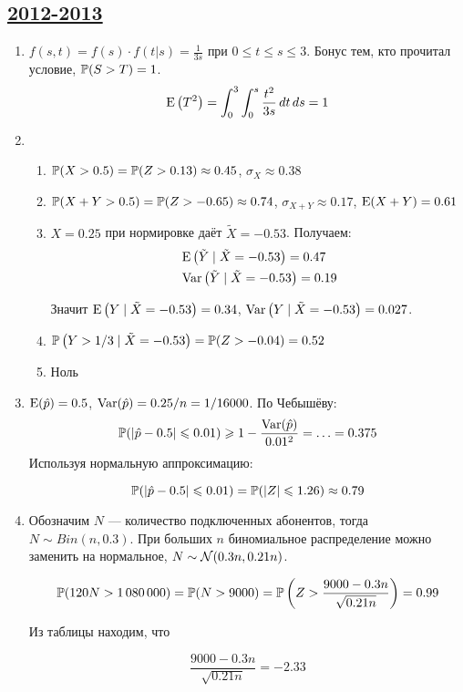 \subsection[2012-2013]{\hyperref[sec:kr_02_2012_2013]{2012-2013}}
\label{sec:sol_kr_02_2012_2013}

\begin{enumerate}
\item  $f(s,t)=f(s)\cdot f(t|s)=\frac{1}{3s}$ при $0\leq t\leq s\leq 3$.
Бонус тем, кто прочитал условие, $\P(S>T)=1$.
\[
\E\left(T^2\right) = \int_0^3\int_0^s \frac{t^2}{3s}\,dt\,ds = 1
\]
\item
\begin{enumerate}
\item $\P(X>0.5) = \P(Z > 0.13) \approx 0.45$, $\sigma_X \approx 0.38$
\item $\P(X+Y>0.5) =
\P(Z>-0.65)\approx 0.74$,
$\sigma_{X+Y} \approx 0.17$, $\E(X+Y) = 0.61$

\item $X = 0.25$ при нормировке даёт $\tilde{X} = -0.53$.
Получаем:
\begin{align*}
& \E\left(\tilde{Y} \mid \tilde{X} = -0.53\right) = 0.47 \\
& \Var\left(\tilde{Y} \mid \tilde{X} = -0.53\right) = 0.19
\end{align*}

Значит $\E\left(Y \mid \tilde{X} = -0.53\right) = 0.34$,
$\Var\left(Y \mid \tilde{X} = -0.53\right)=0.027$.

\item $\P\left(Y > 1/3 \mid \tilde{X} = -0.53\right) = \P(Z > -0.04) = 0.52$
\item Ноль
\end{enumerate}
\item $\E(\hat{p})=0.5$, $\Var(\hat{p})=0.25/n=1/16000$. По Чебышёву:
\[
\P(|\hat{p}-0.5|\leq 0.01)\geq 1-\frac{\Var(\hat{p})}{0.01^2}=\ldots=0.375
\]
Используя нормальную аппроксимацию:

\[
\P(|\hat{p}-0.5|\leq 0.01)=\P(|Z|\leq 1.26)\approx 0.79
\]
\item Обозначим $N$ — количество подключенных абонентов, тогда $N\sim Bin(n,0.3)$.
При больших $n$ биномиальное распределение можно заменить на нормальное,
$N\sim \cN(0.3n,0.21n)$.

\[
\P(120N>1\,080\,000)=\P(N>9000)=\P\left(Z>\frac{9000-0.3n}{\sqrt{0.21n}}\right)=0.99
\]

Из таблицы находим, что

\[
\frac{9000-0.3n}{\sqrt{0.21n}} = -2.33
\]


\end{enumerate}
